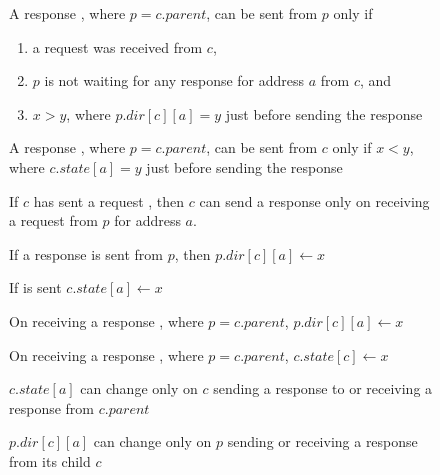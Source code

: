 \begin{figure}\small
\begin{inv}
A response , where $p = c.parent$, can be sent from $p$ only
if
\begin{enumerate}
\item a request  was received from $c$,
\item $p$ is not waiting for any response for address $a$ from $c$, and
\item $x > y$, where $p.dir[c][a] = y$ just before sending the response
\end{enumerate}
\label{pSendRespPre}
\end{inv}
\begin{inv}
A response , where $p = c.parent$, can be sent from $c$ only
if $x < y$, where $c.state[a] = y$ just before sending the
response\label{cSendRespPre1}
\end{inv}
\begin{inv}
If $c$ has sent a request , then $c$ can send a response
 only on receiving a request from $p$ for address $a$.
\label{cSendRespPre2}
\end{inv}
%
\begin{inv}
If a response  is sent from $p$, then $p.dir[c][a] \gets x$\label{cSendRespPost}
\end{inv}
\begin{inv}
If  is sent $c.state[a] \gets x$\label{pSendRespPost}
\end{inv}
\begin{inv}
On receiving a response , where $p = c.parent$, $p.dir[c][a]
\gets x$\label{pRecvResp}
\end{inv}
\begin{inv}
On receiving a response , where $p = c.parent$, $c.state[c]
\gets x$\label{cRecvResp}
\end{inv}
\begin{inv}
$c.state[a]$ can change only on $c$ sending a response to or receiving a
response from $c.parent$\label{cState}
\end{inv}
\begin{inv}
$p.dir[c][a]$ can change only on $p$ sending or receiving a response from
its child $c$\label{pState}
\end{inv}

\end{figure}
